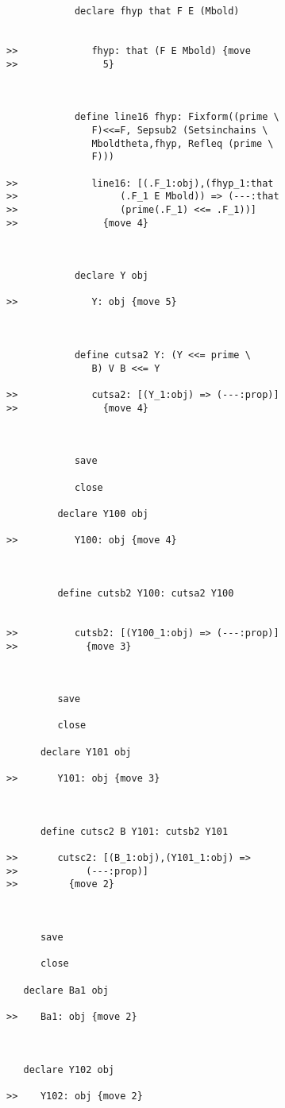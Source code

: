 \documentclass[12pt]{article}
\begin{document}
\begin{verbatim}
            declare fhyp that F E (Mbold)


>>             fhyp: that (F E Mbold) {move
>>               5}



            define line16 fhyp: Fixform((prime \
               F)<<=F, Sepsub2 (Setsinchains \
               Mboldtheta,fhyp, Refleq (prime \
               F)))

>>             line16: [(.F_1:obj),(fhyp_1:that
>>                  (.F_1 E Mbold)) => (---:that
>>                  (prime(.F_1) <<= .F_1))]
>>               {move 4}



            declare Y obj

>>             Y: obj {move 5}



            define cutsa2 Y: (Y <<= prime \
               B) V B <<= Y

>>             cutsa2: [(Y_1:obj) => (---:prop)]
>>               {move 4}



            save

            close

         declare Y100 obj

>>          Y100: obj {move 4}



         define cutsb2 Y100: cutsa2 Y100


>>          cutsb2: [(Y100_1:obj) => (---:prop)]
>>            {move 3}



         save

         close

      declare Y101 obj

>>       Y101: obj {move 3}



      define cutsc2 B Y101: cutsb2 Y101

>>       cutsc2: [(B_1:obj),(Y101_1:obj) =>
>>            (---:prop)]
>>         {move 2}



      save

      close

   declare Ba1 obj

>>    Ba1: obj {move 2}



   declare Y102 obj

>>    Y102: obj {move 2}




\end{verbatim}
\end{document}
